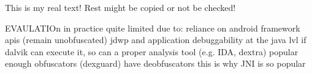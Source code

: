 This is my real text! Rest might be copied or not be checked!

EVAULATIOn
in practice quite limited due to:
reliance on android framework apis (remain unobfuscated)
jdwp and application debuggability at the java lvl
if dalvik can execute it, so can a proper analysis tool (e.g. IDA, dextra)
popular enough obfuscators (dexguard) have deobfuscators
this is why JNI is so popular
